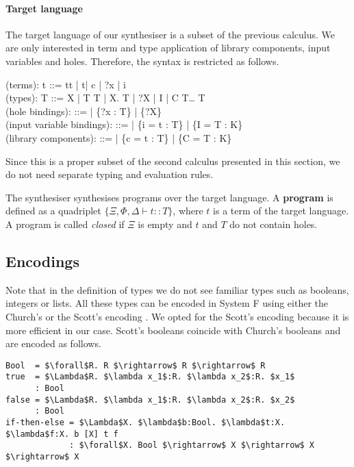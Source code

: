 \paragraph{Target language} The target language of our synthesiser is a subset of the previous calculus. We are only interested in term and type application of library components, input variables and holes. Therefore, the syntax is restricted as follows.
 \begin{plstx}
(terms): t ::= t\;t | t\;[T] | c | ?x | i\\
(types): T ::= X | T \rightarrow T | \forall X.\; T | ?X | I | C\; T\;\ldots\; T\\
(hole bindings): \Xi ::= \emptyset | \Xi \cup \{{?x} : T\} | \Xi \cup \{{?X}\}\\
(input variable bindings): \Phi ::= \emptyset | \Phi \cup \{i = t : T\} | \Phi \cup \{I = T : K\}\\
(library components): \Delta ::= \emptyset | \Delta \cup \{c = t : T\} | \Delta \cup \{C = T : K\}\\
\end{plstx}
Since this is a proper subset of the second calculus presented in this section, we do not need separate typing and evaluation rules.

The synthesiser synthesises programs over the target language. A \textbf{program} is defined as a quadriplet $\{\Xi, \Phi, \Delta \vdash t :: T\}$, where $t$ is a term of the target language.
A program is called \emph{closed} if $\Xi$ is empty and $t$ and $T$ do not contain holes.

  \subsection{Encodings}
Note that in the definition of types we do not see familiar types such as booleans, integers or lists. All these types can be encoded in System F using either the Church's or the Scott's encoding \cite{ScottNumerals}. We opted for the Scott's encoding because it is more efficient in our case.
Scott's booleans coincide with Church's booleans and are encoded as follows.
\begin{lstlisting}[style=plain, mathescape]
Bool  = $\forall$R. R $\rightarrow$ R $\rightarrow$ R
true  = $\Lambda$R. $\lambda x_1$:R. $\lambda x_2$:R. $x_1$
      : Bool
false = $\Lambda$R. $\lambda x_1$:R. $\lambda x_2$:R. $x_2$
      : Bool
if-then-else = $\Lambda$X. $\lambda$b:Bool. $\lambda$t:X. $\lambda$f:X. b [X] t f
             : $\forall$X. Bool $\rightarrow$ X $\rightarrow$ X $\rightarrow$ X
\end{lstlisting}

